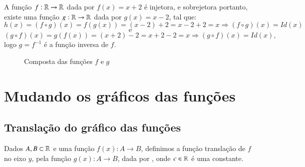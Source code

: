\begin{exem}
 A função $f: \mathbb{R} \rightarrow \mathbb{R}$ dada por $f(x)= x+2$ é injetora, e sobrejetora portanto, existe uma função $g: \mathbb{R} \rightarrow \mathbb{R}$ dada por $g(x)= x-2$, tal que:
 \[h(x)= (f \circ g)(x)= f(g(x))= (x-2) + 2= x-2+2= x \Rightarrow (f \circ g)(x)= Id(x)\]
 \[\text{e}\]
 \[(g \circ f)(x)= g(f(x))= (x+2) - 2= x+2-2= x \Rightarrow (g \circ f)(x)= Id(x) ,\]
 logo $g= f^{-1}$ é a função inversa de $f$.

 \begin{figure}[H]
 \centering
    \caption{Composta das funções $f$ e $g$}
  \end{figure}

\end{exem}

\newpage
 \section{Mudando os gráficos das funções}
 
 \subsection{Translação do gráfico das funções}
 
 Dados $A, B \subset \mathbb{R}$ e uma função $f(x): A \to B$, definimos a função translação de $f$ no eixo $y$, pela função $g(x): A \to B$, dada por , onde $c \in \mathbb{R}$ é uma constante.
 

